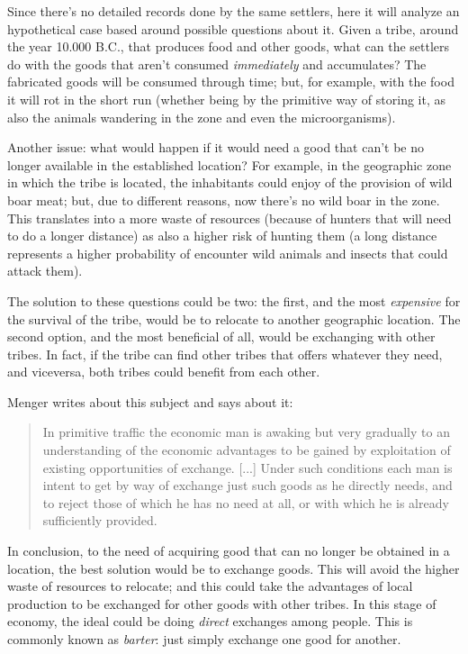 \documentclass[12pt,a4paper,twoside]{book}
\begin{document}
Since there's no detailed records done by the same settlers, here it will analyze an hypothetical case based around possible questions about it. Given a tribe, around the year 10.000 B.C., that produces food and other goods, what can the settlers do with the goods that aren't consumed \textit{immediately} and accumulates? The fabricated goods will be consumed through time; but, for example, with the food it will rot in the short run (whether being by the primitive way of storing it, as also the animals wandering in the zone and even the microorganisms).

Another issue: what would happen if it would need a good that can't be no longer available in the established location? For example, in the geographic zone in which the tribe is located, the inhabitants could enjoy of the provision of wild boar meat; but, due to different reasons, now there's no wild boar in the zone. This translates into a more waste of resources (because of hunters that will need to do a longer distance) as also a higher risk of hunting them (a long distance represents a higher probability of encounter wild animals and insects that could attack them).

The solution to these questions could be two: the first, and the most \textit{expensive} for the survival of the tribe, would be to relocate to another geographic location. The second option, and the most beneficial of all, would be exchanging with other tribes. In fact, if the tribe can find other tribes that offers whatever they need, and viceversa, both tribes could benefit from each other.

Menger writes about this subject and says about it:

\begin{quotation}
In primitive traffic the economic man is awaking but very gradually to an understanding of the economic advantages to be gained by exploitation of existing opportunities of exchange. [...] Under such conditions each man is intent to get by way of exchange just such goods as he directly needs, and to reject those of which he has no need at all, or with which he is already sufficiently provided. \cite[p. 19]{menger:origins}
\end{quotation}

In conclusion, to the need of acquiring good that can no longer be obtained in a location, the best solution would be to exchange goods. This will avoid the higher waste of resources to relocate; and this could take the advantages of local production to be exchanged for other goods with other tribes. In this stage of economy, the ideal could be doing \textit{direct} exchanges among people. This is commonly known as \textit{barter}: just simply exchange one good for another.
\end{document}

